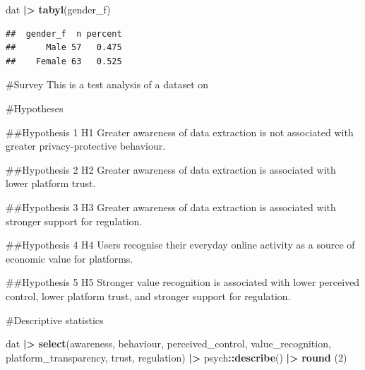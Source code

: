 \documentclass[
]{article}
\newenvironment{Shaded}{\begin{snugshade}}{\end{snugshade}}
\newcommand{\DecValTok}[1]{\textcolor[rgb]{0.00,0.00,0.81}{#1}}
\newcommand{\FunctionTok}[1]{\textcolor[rgb]{0.13,0.29,0.53}{\textbf{#1}}}
\newcommand{\NormalTok}[1]{#1}
\newcommand{\SpecialCharTok}[1]{\textcolor[rgb]{0.81,0.36,0.00}{\textbf{#1}}}
\begin{document}
\begin{Shaded}
\begin{Highlighting}[]
\NormalTok{dat }\SpecialCharTok{|\textgreater{}} \FunctionTok{tabyl}\NormalTok{(gender\_f)}
\end{Highlighting}
\end{Shaded}

\begin{verbatim}
##  gender_f  n percent
##      Male 57   0.475
##    Female 63   0.525
\end{verbatim}

\#Survey This is a test analysis of a dataset on

\#Hypotheses

\#\#Hypothesis 1 H1 Greater awareness of data extraction is not
associated with greater privacy-protective behaviour.

\#\#Hypothesis 2 H2 Greater awareness of data extraction is associated
with lower platform trust.

\#\#Hypothesis 3 H3 Greater awareness of data extraction is associated
with stronger support for regulation.

\#\#Hypothesis 4 H4 Users recognise their everyday online activity as a
source of economic value for platforms.

\#\#Hypothesis 5 H5 Stronger value recognition is associated with lower
perceived control, lower platform trust, and stronger support for
regulation.

\#Descriptive statistics

\begin{Shaded}
\begin{Highlighting}[]
\NormalTok{dat }\SpecialCharTok{|\textgreater{}}
  \FunctionTok{select}\NormalTok{(awareness, behaviour, perceived\_control, value\_recognition,}
\NormalTok{         platform\_transparency, trust, regulation) }\SpecialCharTok{|\textgreater{}}
\NormalTok{  psych}\SpecialCharTok{::}\FunctionTok{describe}\NormalTok{() }\SpecialCharTok{|\textgreater{}}
  \FunctionTok{round}\NormalTok{ (}\DecValTok{2}\NormalTok{)}
\end{Highlighting}
\end{Shaded}
\end{document}
